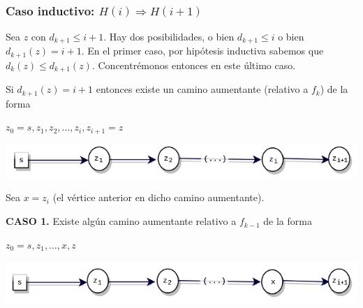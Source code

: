 \documentclass[10pt,a4paper]{article}
\begin{document}
 

\subsubsection*{Caso inductivo: $H(i) \Rightarrow H(i+1)$}

Sea $z$ con $d_{k+1} \leq i + 1$. Hay dos posibilidades, o bien $d_{k+1}\leq i$ o bien $d_{k+1}(z) = i + 1$. En el primer caso, por hipótesis inductiva sabemos que $d_k(z) \leq d_{k+1}(z)$. Concentrémonos entonces en este último caso.

Si $d_{k+1}(z) = i + 1$ entonces existe un camino aumentante (relativo a $f_k$) de la forma

\begin{center}
$z_0 = s, z_1, z_2, \dots, z_i, z_{i+1}=z$
\end{center}

\begin{center}

    \begin{adjustbox}{max size={\textwidth}{\textheight}}
        \includegraphics{definitions/prueba_EK2.jpg}
        \end{adjustbox}
    
\end{center}

Sea $x = z_i$ (el vértice anterior en dicho camino aumentante).

\textbf{CASO 1.} Existe algún camino aumentante relativo a $f_{k-1}$ de la forma 

\begin{center}
$z_0=s, z_1,\dots,x,z$
\end{center}

\begin{center}

    \begin{adjustbox}{max size={\textwidth}{\textheight}}
        \includegraphics{definitions/prueba_EK3.jpg}
        \end{adjustbox}
    
\end{center}
\end{document}
